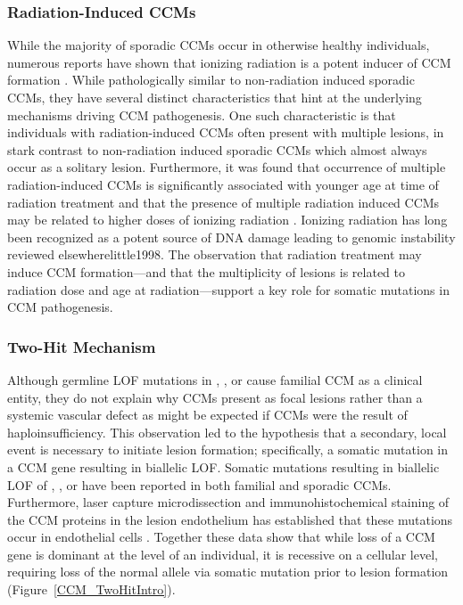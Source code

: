 \subsubsection{Radiation-Induced CCMs}
While the majority of sporadic CCMs occur in otherwise healthy individuals, numerous reports have shown that ionizing radiation is a potent inducer of CCM formation \citep{cutsforthgregory2015, heckl2002, jain2005, burn2007, strenger2008, vinchon2011, koike2012, martinezlage2008, novelli1997, baumgartner2003}. While pathologically similar to non-radiation induced sporadic CCMs, they have several distinct characteristics that hint at the underlying mechanisms driving CCM pathogenesis. One such characteristic is that individuals with radiation-induced CCMs often present with multiple lesions, in stark contrast to non-radiation induced sporadic CCMs which almost always occur as a solitary lesion. Furthermore, it was found that occurrence of multiple radiation-induced CCMs is significantly associated with younger age at time of radiation treatment \citep{cutsforthgregory2015} and that the presence of multiple radiation induced CCMs may be related to higher doses of ionizing radiation \citep{novelli1997}. Ionizing radiation has long been recognized as a potent source of DNA damage leading to genomic instability reviewed elsewhere{little1998}. The observation that radiation treatment may induce CCM formation---and that the multiplicity of lesions is related to radiation dose and age at radiation---support a key role for somatic mutations in CCM pathogenesis.

\subsubsection{Two-Hit Mechanism}
Although germline LOF mutations in , , or  cause familial CCM as a clinical entity, they do not explain why CCMs present as focal lesions rather than a systemic vascular defect as might be expected if CCMs were the result of haploinsufficiency. This observation led to the hypothesis that a secondary, local event is necessary to initiate lesion formation; specifically, a somatic mutation in a CCM gene resulting in biallelic LOF. Somatic mutations resulting in biallelic LOF of , , or  have been reported in both familial \citep{gault2005, akers2009, gault2009} and sporadic \citep{mcdonald2014} CCMs. Furthermore, laser capture microdissection and immunohistochemical staining of the CCM proteins in the lesion endothelium has established that these mutations occur in endothelial cells \citep{akers2009, pagenstecher2009, rath2020}. Together these data show that while loss of a CCM gene is dominant at the level of an individual, it is recessive on a cellular level, requiring loss of the normal allele via somatic mutation prior to lesion formation (Figure~\ref{CCM_TwoHitIntro}).   

